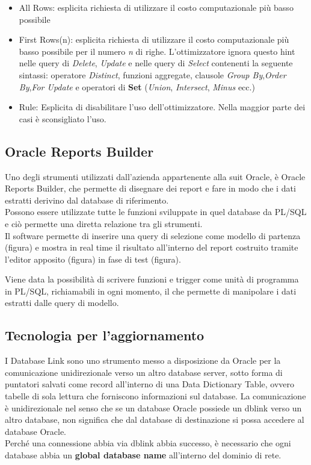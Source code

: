 \begin{itemize}
\item All Rows: esplicita richiesta di utilizzare il costo computazionale più basso possibile
\item First Rows(n): esplicita richiesta di utilizzare il costo computazionale più basso possibile per il numero \textit{n} di righe. L'ottimizzatore ignora questo hint nelle query di \textit{Delete}, \textit{Update} e nelle query di \textit{Select} contenenti la seguente sintassi: operatore \textit{Distinct}, funzioni aggregate, clausole \textit{Group By},\textit{Order By},\textit{For Update} e operatori  di \textbf{Set} (\textit{Union}, \textit{Intersect}, \textit{Minus} ecc.)
\item Rule: Esplicita di disabilitare l'uso dell'ottimizzatore. Nella maggior parte dei casi è sconsigliato l'uso.
\end{itemize}
\subsection{Oracle Reports Builder}
Uno degli strumenti utilizzati dall'azienda appartenente alla suit Oracle, è Oracle Reports Builder, che permette di disegnare dei report e fare in modo che i dati estratti derivino dal database di riferimento.\\
Possono essere utilizzate tutte le funzioni sviluppate in quel database da PL/SQL e ciò permette una diretta relazione tra gli strumenti.\\
Il software permette di inserire una query di selezione come modello di partenza (figura) e mostra in real time il risultato all'interno del report costruito tramite l'editor apposito (figura) in fase di test (figura).
%

Viene data la possibilità di scrivere funzioni e trigger come unità di programma in PL/SQL, richiamabili in ogni momento, il che permette di manipolare i dati estratti dalle query di modello.



\subsection{Tecnologia per l'aggiornamento}
I Database Link sono uno strumento messo a disposizione da Oracle per la comunicazione unidirezionale verso un altro database server, sotto forma di puntatori salvati come record all'interno di una Data Dictionary Table, ovvero tabelle di sola lettura che forniscono informazioni sul database. La comunicazione è unidirezionale nel senso che se un database Oracle possiede un dblink verso un altro database, non significa che dal database di destinazione si possa accedere al database Oracle.\\
Perché una connessione abbia via dblink abbia successo, è necessario che ogni database abbia un \textbf{global database name} all'interno del dominio di rete.\newline
[...]